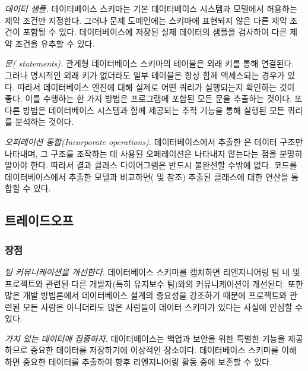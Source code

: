 \documentclass[a4paper,10pt,twoside]{book}
\begin{document}
\begin{bulletlist}
\item \emph{데이터 샘플.}
데이터베이스 스키마는 기본 데이터베이스 시스템과 모델에서 허용하는 제약 조건만 지정한다. 그러나 문제 도메인에는 스키마에 표현되지 않은 다른 제약 조건이 포함될 수 있다. 데이터베이스에 저장된 실제 데이터의 샘플을 검사하여 다른 제약 조건을 유추할 수 있다.

\item \emph{ 문( statements).}
관계형 데이터베이스 스키마의 테이블은 외래 키를 통해 연결된다. 그러나 명시적인 외래 키가 없더라도 일부 테이블은 항상 함께 액세스되는 경우가 있다. 따라서 데이터베이스 엔진에 대해 실제로 어떤 쿼리가 실행되는지 확인하는 것이 좋다. 이를 수행하는 한 가지 방법은 프로그램에 포함된 모든  문을 추출하는 것이다. 또 다른 방법은 데이터베이스 시스템과 함께 제공되는 추적 기능을 통해 실행된 모든 쿼리를 분석하는 것이다.

\end{bulletlist}

\noindent
\emph{오퍼레이션 통합(Incorporate operations).}
데이터베이스에서 추출한 은 데이터 구조만 나타내며, 그 구조를 조작하는 데 사용된 오페레이션은 나타내지 않는다는 점을 분명히 알아야 한다. 따라서 결과 클래스 다이어그램은 반드시 불완전할 수밖에 없다. 코드를 데이터베이스에서 추출한 모델과 비교하면( 및  참조) 추출된 클래스에 대한 연산을 통합할 수 있다.

\subsection*{트레이드오프}

\subsubsection*{장점}

\begin{bulletlist}
\item \emph{팀 커뮤니케이션을 개선한다.} 데이터베이스 스키마를 캡처하면 리엔지니어링 팀 내 및 프로젝트와 관련된 다른 개발자(특히 유지보수 팀)와의 커뮤니케이션이 개선된다. 또한 많은 개발 방법론에서 데이터베이스 설계의 중요성을 강조하기 때문에 프로젝트와 관련된 모든 사람은 아니더라도 많은 사람들이 데이터 스키마가 있다는 사실에 안심할 수 있다.

\item \emph{가치 있는 데이터에 집중하자.} 데이터베이스는 백업과 보안을 위한 특별한 기능을 제공하므로 중요한 데이터를 저장하기에 이상적인 장소이다. 데이터베이스 스키마를 이해하면 중요한 데이터를 추출하여 향후 리엔지니어링 활동 중에 보존할 수 있다.
\end{bulletlist}
\end{document}
